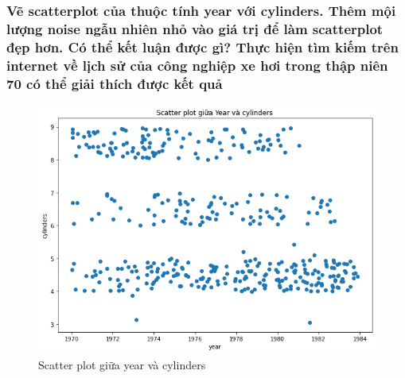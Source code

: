 \documentclass[a4paper, 12pt]{article}
\begin{document}
    \subsubsection{Vẽ scatterplot của thuộc tính year với cylinders. Thêm mội lượng noise ngẫu nhiên nhỏ vào giá trị để làm scatterplot đẹp hơn. Có thể kết luận được gì? Thực hiện tìm kiếm trên internet về lịch sử của công nghiệp xe hơi trong thập niên 70 có thể giải thích được kết quả}
        \begin{figure}[H]
            \centering
                \includegraphics[scale=0.8]{img/year-cylinders.png}
                \caption{Scatter plot giữa year và cylinders}
        \end{figure}
        
\end{document}
